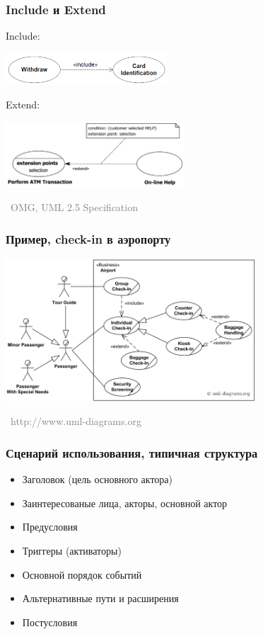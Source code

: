 \documentclass[xetex,mathserif,serif]{beamer}
\newcommand{\attribution}[1] {
	\vspace{-5mm}\begin{flushright}\begin{scriptsize}\textcolor{gray}{\textcopyright\, #1}\end{scriptsize}\end{flushright}
}
\begin{document}
	\begin{frame}
		\frametitle{Include и Extend}
		Include:
		\begin{center}
			\includegraphics[width=0.45\textwidth]{useCaseInclude.png}
		\end{center}
		\vspace{5mm}
		Extend:
		\begin{center}
			\includegraphics[width=0.5\textwidth]{useCaseExtend.png}
		\end{center}
		\attribution{OMG, UML 2.5 Specification}
	\end{frame}

	\begin{frame}
		\frametitle{Пример, check-in в аэропорту}
		\begin{center}
			\includegraphics[width=0.7\textwidth]{airportUseCase.png}
			\attribution{http://www.uml-diagrams.org}
		\end{center}
	\end{frame}

	\begin{frame}
		\frametitle{Сценарий использования, типичная структура}
		\begin{itemize}
			\item Заголовок (цель основного актора)
			\item Заинтересованые лица, акторы, основной актор
			\item Предусловия
			\item Триггеры (активаторы)
			\item Основной порядок событий
			\item Альтернативные пути и расширения
			\item Постусловия
		\end{itemize}
	\end{frame}
\end{document}

